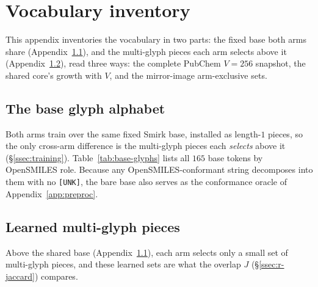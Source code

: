 \documentclass{article}
\begin{document}
\section{Vocabulary inventory}\label{app:vocab}

This appendix inventories the vocabulary in two parts: the fixed base both
arms share (Appendix~\ref{app:base-glyphs}), and the multi-glyph pieces each arm
selects above it (Appendix~\ref{app:multiglyph}), read three ways: the complete
PubChem $V{=}256$ snapshot, the shared core's growth with $V$, and the
mirror-image arm-exclusive sets.

\subsection{The base glyph alphabet}\label{app:base-glyphs}



Both arms train over the same fixed Smirk base, installed as length-$1$ pieces,
so the only cross-arm difference is the multi-glyph pieces each \emph{selects}
above it (\S\ref{ssec:training}). Table~\ref{tab:base-glyphs} lists all $165$ base
tokens by OpenSMILES role. Because any OpenSMILES-conformant string decomposes
into them with no \texttt{[UNK]}, the bare base also serves as the conformance
oracle of Appendix~\ref{app:preproc}.

\subsection{Learned multi-glyph pieces}\label{app:multiglyph}

Above the shared base (Appendix~\ref{app:base-glyphs}), each arm selects only a
small set of multi-glyph pieces, and these learned sets are what the overlap $J$
(\S\ref{ssec:r-jaccard}) compares.
\end{document}

